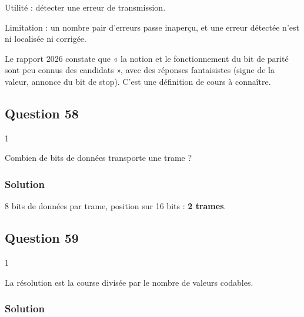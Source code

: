 \documentclass[11pt,a4paper]{article}
\newcommand{\equationajustee}[1]{%
  \sbox{\boiteequation}{$\displaystyle #1$}%
  \ifdim\wd\boiteequation>\linewidth
    \[\resizebox{\linewidth}{!}{\usebox{\boiteequation}}\]%
  \else
    \[#1\]%
  \fi}
\begin{document}
Utilité : détecter une erreur de transmission.

Limitation : un nombre pair d'erreurs passe inaperçu, et une erreur détectée n'est ni localisée ni corrigée.

\begin{jury}

Le rapport 2026 constate que « la notion et le fonctionnement du bit de parité sont peu connus des candidats », avec des réponses fantaisistes (signe de la valeur, annonce du bit de stop). C'est une définition de cours à connaître.

\end{jury}

\hypertarget{question-58}{%
\subsection{Question 58}\label{question-58}}

\begin{indication}{1}

Combien de bits de données transporte une trame ?

\end{indication}

\hypertarget{solution-57}{%
\subsubsection{Solution}\label{solution-57}}

8 bits de données par trame, position sur 16 bits : \textbf{2 trames}.

\hypertarget{question-59}{%
\subsection{Question 59}\label{question-59}}

\begin{indication}{1}

La résolution est la course divisée par le nombre de valeurs codables.

\end{indication}

\hypertarget{solution-58}{%
\subsubsection{Solution}\label{solution-58}}

\equationajustee{\boxed{q=\frac{1500}{2^{16}}\simeq0{,}023\ \text{mm}}}
\end{document}
